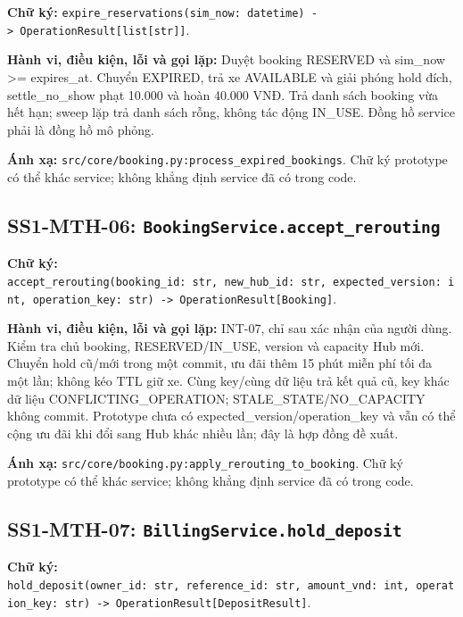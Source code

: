 \documentclass[11pt,a4paper]{article}
\begin{document}
\textbf{Chữ ký:}
\texttt{expire\_reservations(sim\_now:\ datetime)\ -\textgreater{}\ OperationResult{[}list{[}str{]}{]}}.

\textbf{Hành vi, điều kiện, lỗi và gọi lặp:} Duyệt booking RESERVED và
sim\_now \textgreater= expires\_at. Chuyển EXPIRED, trả xe AVAILABLE và
giải phóng hold đích, settle\_no\_show phạt 10.000 và hoàn 40.000 VNĐ.
Trả danh sách booking vừa hết hạn; sweep lặp trả danh sách rỗng, không
tác động IN\_USE. Đồng hồ service phải là đồng hồ mô phỏng.

\textbf{Ánh xạ:}
\texttt{src/core/booking.py:process\_expired\_bookings}. Chữ ký
prototype có thể khác service; không khẳng định service đã có trong
code.

\hypertarget{ss1-mth-06-bookingservice.accept_rerouting}{%
\subsection{\texorpdfstring{SS1-MTH-06:
\texttt{BookingService.accept\_rerouting}}{SS1-MTH-06: BookingService.accept\_rerouting}}\label{ss1-mth-06-bookingservice.accept_rerouting}}

\textbf{Chữ ký:}
\texttt{accept\_rerouting(booking\_id:\ str,\ new\_hub\_id:\ str,\ expected\_version:\ int,\ operation\_key:\ str)\ -\textgreater{}\ OperationResult{[}Booking{]}}.

\textbf{Hành vi, điều kiện, lỗi và gọi lặp:} INT-07, chỉ sau xác nhận
của người dùng. Kiểm tra chủ booking, RESERVED/IN\_USE, version và
capacity Hub mới. Chuyển hold cũ/mới trong một commit, ưu đãi thêm 15
phút miễn phí tối đa một lần; không kéo TTL giữ xe. Cùng key/cùng dữ
liệu trả kết quả cũ, key khác dữ liệu CONFLICTING\_OPERATION;
STALE\_STATE/NO\_CAPACITY không commit. Prototype chưa có
expected\_version/operation\_key và vẫn có thể cộng ưu đãi khi đổi sang
Hub khác nhiều lần; đây là hợp đồng đề xuất.

\textbf{Ánh xạ:}
\texttt{src/core/booking.py:apply\_rerouting\_to\_booking}. Chữ ký
prototype có thể khác service; không khẳng định service đã có trong
code.

\hypertarget{ss1-mth-07-billingservice.hold_deposit}{%
\subsection{\texorpdfstring{SS1-MTH-07:
\texttt{BillingService.hold\_deposit}}{SS1-MTH-07: BillingService.hold\_deposit}}\label{ss1-mth-07-billingservice.hold_deposit}}

\textbf{Chữ ký:}
\texttt{hold\_deposit(owner\_id:\ str,\ reference\_id:\ str,\ amount\_vnd:\ int,\ operation\_key:\ str)\ -\textgreater{}\ OperationResult{[}DepositResult{]}}.
\end{document}
